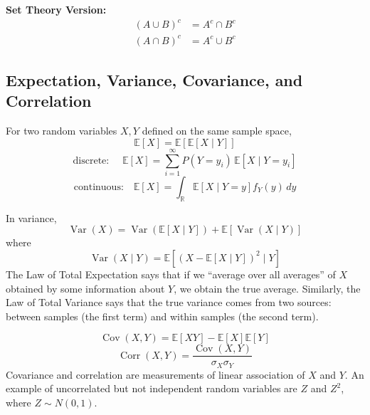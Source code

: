 \documentclass{article}
\begin{document}
\begin{tcolorbox}[title=De Morgan's Laws]
\textbf{Set Theory Version:}
\begin{align*}
(A \cup B)^c &= A^c \cap B^c \\
(A \cap B)^c &= A^c \cup B^c
\end{align*}
\end{tcolorbox}


\subsection{Expectation, Variance, Covariance, and Correlation}


\begin{tcolorbox}[colback=white,colframe=black,title={Law of Total Expectation and Variance}]
For two random variables $X, Y$ defined on the same sample space,
\[
\mathbb{E}[X] = \mathbb{E}[\mathbb{E}[X \mid Y]]
\]
\[
\text{discrete: } \quad \mathbb{E}[X] = \sum_{i=1}^\infty P(Y = y_i) \, \mathbb{E}[X \mid Y = y_i]
\]
\[
\text{continuous:} \quad \mathbb{E}[X] = \int_{\mathbb{R}} \mathbb{E}[X \mid Y = y] f_Y(y) \, dy
\]

In variance,
\[
\operatorname{Var}(X) = \operatorname{Var}(\mathbb{E}[X \mid Y]) + \mathbb{E}[\operatorname{Var}(X \mid Y)]
\]
where
\[
\operatorname{Var}(X \mid Y) = \mathbb{E}[(X - \mathbb{E}[X \mid Y])^2 \mid Y]
\]
The Law of Total Expectation says that if we “average over all averages” of $X$ obtained by some information about $Y$, we obtain the true average. Similarly, the Law of Total Variance says that the true variance comes from two sources: between samples (the first term) and within samples (the second term).
\end{tcolorbox}

\begin{tcolorbox}[colback=white,colframe=black,title={Covariance and Correlation}]
\[
\operatorname{Cov}(X,Y) = \mathbb{E}[XY] - \mathbb{E}[X]\mathbb{E}[Y]
\]
\[
\operatorname{Corr}(X,Y) = \frac{\operatorname{Cov}(X,Y)}{\sigma_X \sigma_Y}
\]
Covariance and correlation are measurements of linear association of $X$ and $Y$. An example of uncorrelated but not independent random variables are $Z$ and $Z^2$, where $Z \sim N(0,1)$.
\end{tcolorbox}
\end{document}
